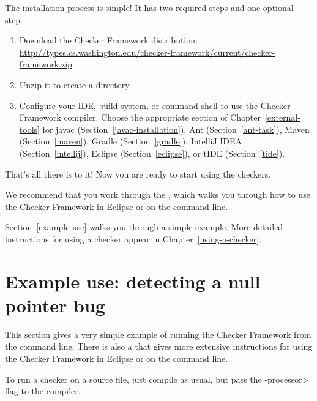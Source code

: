 The installation process is simple!  It has two required steps and one
optional step.
\begin{enumerate}
\item
  Download the Checker Framework distribution:
  \\
  \url{http://types.cs.washington.edu/checker-framework/current/checker-framework.zip}

\item 
  Unzip it to create a  directory.

\item
  \label{installation-configure-step}
  Configure your IDE, build system, or command shell to use the Checker
  Framework compiler.  Choose the appropriate section of
  Chapter~\ref{external-tools} for
javac (Section~\ref{javac-installation}),
Ant (Section~\ref{ant-task}),
Maven (Section~\ref{maven}),
Gradle (Section~\ref{gradle}),
IntelliJ IDEA (Section~\ref{intellij}),
Eclipse (Section~\ref{eclipse}),
or
tIDE (Section~\ref{tide}).


\end{enumerate}

That's all there is to it!  Now you are ready to start using the checkers.

We recommend that you work through the
, which walks you through how to use the Checker
Framework in Eclipse or on
the command line.

Section~\ref{example-use} walks you through a simple example.  More detailed
instructions for using a checker appear in Chapter~\ref{using-a-checker}.



\section{Example use:  detecting a null pointer bug\label{example-use}}

This section gives a very simple example of running the Checker Framework
from the command line.  There is also a 
that gives more extensive instructions for using the Checker Framework in
Eclipse or on the command line.


To run a checker on a source file, just compile as usual, but pass the
\<-processor> flag to the compiler.

